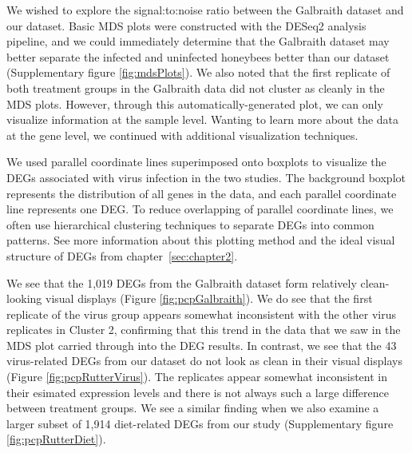 \documentclass[11pt,a4paper,oldfontcommands,openany]{memoir}
\numberwithin{equation}{section} %
\begin{document}
We wished to explore the signal:to:noise ratio between the Galbraith dataset and our dataset. Basic MDS plots were constructed with the DESeq2 analysis pipeline, and we could immediately determine that the Galbraith dataset may better separate the infected and uninfected honeybees better than our dataset (Supplementary figure \ref{fig:mdsPlots}). We also noted that the first replicate of both treatment groups in the Galbraith data did not cluster as cleanly in the MDS plots. However, through this automatically-generated plot, we can only visualize information at the sample level. Wanting to learn more about the data at the gene level, we continued with additional visualization techniques.

We used parallel coordinate lines superimposed onto boxplots to visualize the DEGs associated with virus infection in the two studies. The background boxplot represents the distribution of all genes in the data, and each parallel coordinate line represents one DEG. To reduce overlapping of parallel coordinate lines, we often use hierarchical clustering techniques to separate DEGs into common patterns. See more information about this plotting method and the ideal visual structure of DEGs from chapter~\ref{sec:chapter2}.

We see that the 1,019 DEGs from the Galbraith dataset form relatively clean-looking visual displays (Figure \ref{fig:pcpGalbraith}). We do see that the first replicate of the virus group appears somewhat inconsistent with the other virus replicates in Cluster 2, confirming that this trend in the data that we saw in the MDS plot carried through into the DEG results. In contrast, we see that the 43 virus-related DEGs from our dataset do not look as clean in their visual displays (Figure \ref{fig:pcpRutterVirus}). The replicates appear somewhat inconsistent in their esimated expression levels and there is not always such a large difference between treatment groups. We see a similar finding when we also examine a larger subset of 1,914 diet-related DEGs from our study (Supplementary figure \ref{fig:pcpRutterDiet}). 
\end{document}

